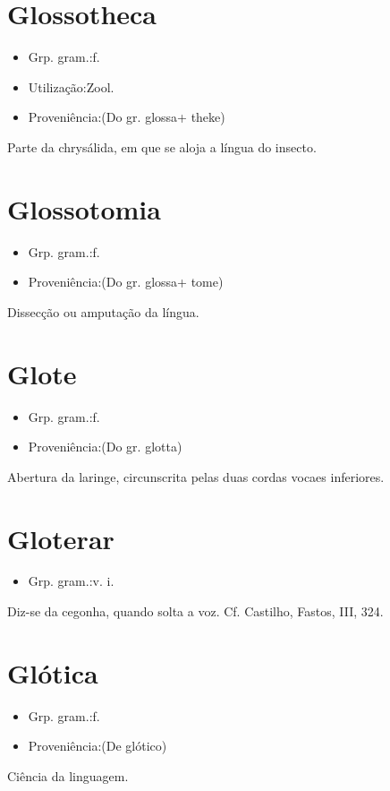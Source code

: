 \section{Glossotheca}
\begin{itemize}
\item {Grp. gram.:f.}
\end{itemize}
\begin{itemize}
\item {Utilização:Zool.}
\end{itemize}
\begin{itemize}
\item {Proveniência:(Do gr. \textunderscore glossa\textunderscore  + \textunderscore theke\textunderscore )}
\end{itemize}
Parte da chrysálida, em que se aloja a língua do insecto.
\section{Glossotomia}
\begin{itemize}
\item {Grp. gram.:f.}
\end{itemize}
\begin{itemize}
\item {Proveniência:(Do gr. \textunderscore glossa\textunderscore  + \textunderscore tome\textunderscore )}
\end{itemize}
Dissecção ou amputação da língua.
\section{Glote}
\begin{itemize}
\item {Grp. gram.:f.}
\end{itemize}
\begin{itemize}
\item {Proveniência:(Do gr. \textunderscore glotta\textunderscore )}
\end{itemize}
Abertura da laringe, circunscrita pelas duas cordas vocaes inferiores.
\section{Gloterar}
\begin{itemize}
\item {Grp. gram.:v. i.}
\end{itemize}
Diz-se da cegonha, quando solta a voz. Cf. Castilho, \textunderscore Fastos\textunderscore , III, 324.
\section{Glótica}
\begin{itemize}
\item {Grp. gram.:f.}
\end{itemize}
\begin{itemize}
\item {Proveniência:(De \textunderscore glótico\textunderscore )}
\end{itemize}
Ciência da linguagem.
